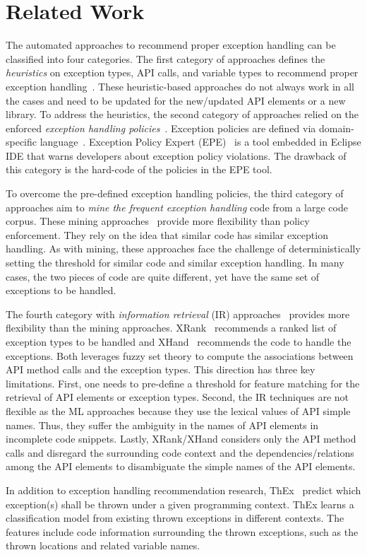 \section{Related Work}
\label{sec:related}

The automated approaches to recommend proper exception handling can be
classified into four categories. The first category of approaches
defines the {\em heuristics} on exception types, API calls, and
variable types to recommend proper exception
handling~\cite{barbosa-bsse12}. These heuristic-based approaches do
not always work in all the cases and need to be updated for the
new/updated API elements or a new library. To address the heuristics,
the second category of approaches relied on the enforced {\em
  exception handling policies}~\cite{barbosa-tse16,barbosa-saner18}.
Exception policies are defined via domain-specific
language~\cite{barbosa-tse16}. Exception Policy Expert
(EPE)~\cite{barbosa-saner18} is a tool embedded in Eclipse IDE that
warns developers about exception policy violations. The drawback of
this category is the hard-code of the policies in the EPE tool.

To overcome the pre-defined exception handling policies, the third
category of approaches aim to {\em mine the frequent exception
  handling} code from a large code corpus. These mining
approaches~\cite{chanchal-scam14} provide more flexibility than policy
enforcement. They rely on the idea that similar code has similar
exception handling. As with mining, these approaches face the
challenge of deterministically setting the threshold for similar code
and similar exception handling. In many cases, the two pieces of code
are quite different, yet have the same set of exceptions to be
handled.

The fourth category with {\em information retrieval} (IR)
approaches~\cite{xrank-fse20} provides more flexibility than the
mining approaches. XRank~\cite{xrank-fse20} recommends a ranked list
of exception types to be handled and XHand~\cite{xrank-fse20}
recommends the code to handle the exceptions. Both leverages fuzzy set
theory to compute the associations between API method calls and the
exception types. This direction has three key limitations. First, one
needs to pre-define a threshold for feature matching for the retrieval
of API elements or exception types. Second, the IR techniques are not
flexible as the ML approaches because they use the lexical values of
API simple names. Thus, they suffer the ambiguity in the names of API
elements in incomplete code snippets. Lastly, XRank/XHand considers
only the API method calls and disregard the surrounding code context
and the dependencies/relations among the API elements to disambiguate
the simple names of the API elements.

In addition to exception handling recommendation research,
ThEx~\cite{thex-ase22} predict which exception(s) shall be thrown
under a given programming context. ThEx learns a classification model
from existing thrown exceptions in different contexts. The features
include code information surrounding the thrown exceptions, such as
the thrown locations and related variable names.

